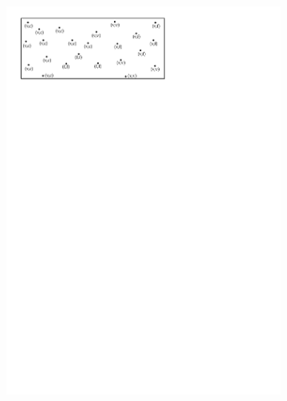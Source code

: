 \begin{figure}
\begin{subfigure}[b]{0.45\linewidth}
    \includegraphics[page=2,width=\textwidth]{figs/vd}
    \caption{}
  \end{subfigure}
  \qquad
  \begin{subfigure}[b]{0.45\linewidth}
    \centering

\end{subfigure}
\end{figure}
